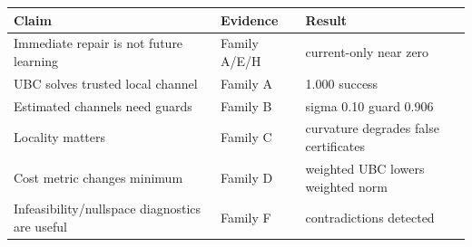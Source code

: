 \begin{tabular}{lll}
\toprule
Claim & Evidence & Result \\
\midrule
Immediate repair is not future learning & Family A/E/H & current-only near zero \\
UBC solves trusted local channel & Family A & 1.000 success \\
Estimated channels need guards & Family B & sigma 0.10 guard 0.906 \\
Locality matters & Family C & curvature degrades false certificates \\
Cost metric changes minimum & Family D & weighted UBC lowers weighted norm \\
Infeasibility/nullspace diagnostics are useful & Family F & contradictions detected \\
\bottomrule
\end{tabular}
